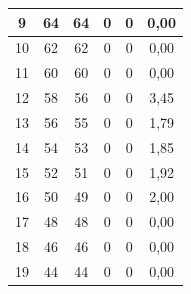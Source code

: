 \begin{longtable}{|c|c|c|c|c|c|}
	9                                            & 64                     & 64                    & 0                     & 0                      & 0,00                                               \\ \hline
	10                                           & 62                     & 62                    & 0                     & 0                      & 0,00                                               \\ \hline
	11                                           & 60                     & 60                    & 0                     & 0                      & 0,00                                               \\ \hline
	12                                           & 58                     & 56                    & 0                     & 0                      & 3,45                                               \\ \hline
	13                                           & 56                     & 55                    & 0                     & 0                      & 1,79                                               \\ \hline
	14                                           & 54                     & 53                    & 0                     & 0                      & 1,85                                               \\ \hline
	15                                           & 52                     & 51                    & 0                     & 0                      & 1,92                                               \\ \hline
	16                                           & 50                     & 49                    & 0                     & 0                      & 2,00                                               \\ \hline
	17                                           & 48                     & 48                    & 0                     & 0                      & 0,00                                               \\ \hline
	18                                           & 46                     & 46                    & 0                     & 0                      & 0,00                                               \\ \hline
	19                                           & 44                     & 44                    & 0                     & 0                      & 0,00                                               \\ \hline

\end{longtable}
